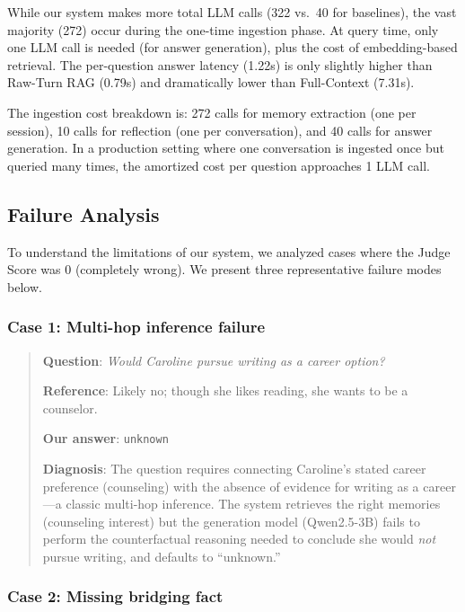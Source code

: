 \documentclass[11pt]{article}
\begin{document}
While our system makes more total LLM calls (322 vs.\ 40 for baselines), the vast majority (272) occur during the one-time ingestion phase. At query time, only one LLM call is needed (for answer generation), plus the cost of embedding-based retrieval. The per-question answer latency (1.22s) is only slightly higher than Raw-Turn RAG (0.79s) and dramatically lower than Full-Context (7.31s).

The ingestion cost breakdown is: 272 calls for memory extraction (one per session), 10 calls for reflection (one per conversation), and 40 calls for answer generation. In a production setting where one conversation is ingested once but queried many times, the amortized cost per question approaches 1 LLM call.

\subsection{Failure Analysis}

To understand the limitations of our system, we analyzed cases where the Judge Score was 0 (completely wrong). We present three representative failure modes below.

\subsubsection{Case 1: Multi-hop inference failure}

\begin{quote}
\textbf{Question}: \textit{Would Caroline pursue writing as a career option?}

\textbf{Reference}: Likely no; though she likes reading, she wants to be a counselor.

\textbf{Our answer}: \texttt{unknown}

\textbf{Diagnosis}: The question requires connecting Caroline's stated career preference (counseling) with the absence of evidence for writing as a career---a classic multi-hop inference. The system retrieves the right memories (counseling interest) but the generation model (Qwen2.5-3B) fails to perform the counterfactual reasoning needed to conclude she would \textit{not} pursue writing, and defaults to ``unknown.''
\end{quote}

\subsubsection{Case 2: Missing bridging fact}
\end{document}
